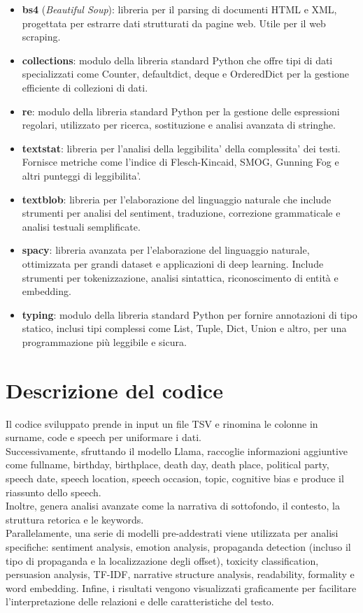 \documentclass{article}
\begin{document}
\begin{itemize}
	\item \textbf{bs4} (\textit{Beautiful Soup}): libreria per il parsing di documenti HTML e XML, progettata per estrarre dati strutturati da pagine web. Utile per il web scraping.
	\item \textbf{collections}: modulo della libreria standard Python che offre tipi di dati specializzati come Counter, defaultdict, deque e OrderedDict per la gestione efficiente di collezioni di dati.
	\item \textbf{re}: modulo della libreria standard Python per la gestione delle espressioni regolari, utilizzato per ricerca, sostituzione e analisi avanzata di stringhe.
	\item \textbf{textstat}: libreria per l'analisi della leggibilita' della complessita' dei testi. Fornisce metriche come l'indice di Flesch-Kincaid, SMOG, Gunning Fog e altri punteggi di leggibilita'.
	\item \textbf{textblob}: libreria per l'elaborazione del linguaggio naturale che include strumenti per analisi del sentiment, traduzione, correzione grammaticale e analisi testuali semplificate.
	\item \textbf{spacy}: libreria avanzata per l'elaborazione del linguaggio naturale, ottimizzata per grandi dataset e applicazioni di deep learning. Include strumenti per tokenizzazione, analisi sintattica, riconoscimento di entità e embedding.
	\item \textbf{typing}: modulo della libreria standard Python per fornire annotazioni di tipo statico, inclusi tipi complessi come List, Tuple, Dict, Union e altro, per una programmazione più leggibile e sicura.
\end{itemize}

\section{Descrizione del codice}
Il codice sviluppato prende in input un file TSV e rinomina le colonne in surname, code e speech per uniformare i dati.\\
Successivamente, sfruttando il modello Llama, raccoglie informazioni aggiuntive come fullname, birthday, birthplace, death day, death place, political party, speech date, speech location, speech occasion, topic, cognitive bias e produce il riassunto dello speech. \\
Inoltre, genera analisi avanzate come la narrativa di sottofondo, il contesto, la struttura retorica e le keywords.\\
Parallelamente, una serie di modelli pre-addestrati viene utilizzata per analisi specifiche: sentiment analysis, emotion analysis, propaganda detection (incluso il tipo di propaganda e la localizzazione degli offset), toxicity classification, persuasion analysis, TF-IDF, narrative structure analysis, readability, formality e word embedding. Infine, i risultati vengono visualizzati graficamente per facilitare l’interpretazione delle relazioni e delle caratteristiche del testo.
\end{document}
